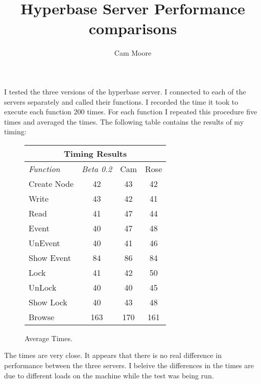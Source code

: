 





\title{Hyperbase Server Performance comparisons} \author{Cam Moore}

\maketitle

I tested the three versions of the hyperbase server.  I connected to each
of the servers separately and called their functions.  I recorded the time
it took to execute each function 200 times.  For each function I repeated
this procedure five times and averaged the times.  The following table
contains the results of my timing:

\small

             \begin{figure}[htpb]
             \begin{center}
             \begin{tabular} {|l|c|c|c|} \hline
             \multicolumn{4}{|c|}{{\bf Timing Results}} \\  \hline
{\em Function} & {\em Beta 0.2} & {Cam} & {Rose}\\ \hline
Create Node & 42 & 43 & 42  \\
\hline
Write & 43 & 42 & 41 \\
\hline
Read & 41 & 47 & 44 \\
\hline
Event & 40 & 47 & 48 \\
\hline
UnEvent & 40 & 41 & 46 \\
\hline
Show Event & 84 & 86 & 84 \\
\hline
Lock & 41 & 42 & 50 \\
\hline
UnLock & 40 & 40 & 45 \\
\hline
Show Lock & 40 & 43 & 48 \\
\hline
Browse & 163 & 170 & 161\\
\hline
\end{tabular}
             \end{center}
             \caption{Average Times. }
             \end{figure}
             \normalsize
The times are very close.  It appears that there is no real difference in
performance between the three servers.  I beleive the differences in the
times are due to different loads on the machine while the test was being run.






